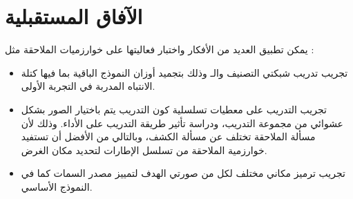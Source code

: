 \section{الآفاق المستقبلية}
يمكن تطبيق العديد من الأفكار واختبار فعاليتها على خوارزميات الملاحقة مثل :
\begin{itemize}
	\item
	تجريب تدريب شبكتي التصنيف والـ
	وذلك بتجميد أوزان النموذج الباقية بما فيها كتلة الانتباه المدربة في التجربة الأولى.
	\item
	تجريب التدريب على معطيات تسلسلية كون التدريب يتم باختيار الصور بشكل عشوائي من مجموعة التدريب، ودراسة تأثير طريقة التدريب على الأداء. وذلك لأن مسألة الملاحقة تختلف عن مسألة الكشف، وبالتالي من الأفضل أن تستفيد خوارزمية الملاحقة من تسلسل الإطارات لتحديد مكان الغرض.
	\item
	تجريب ترميز مكاني مختلف لكل من صورتي الهدف لتمييز مصدر السمات كما في النموذج الأساسي.
	
\end{itemize}
	
	
